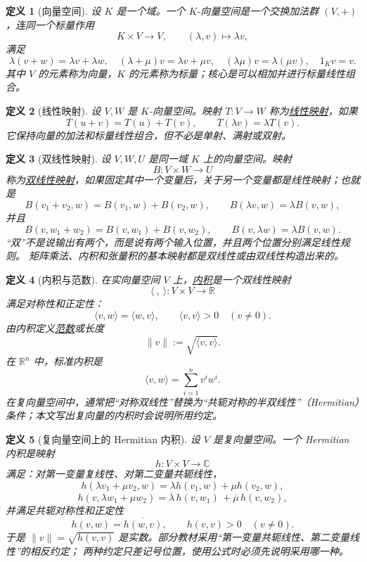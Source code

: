 \documentclass[UTF8,fontset=none,a4paper,11pt]{ctexart}
\theoremstyle{foundation-definition}
\newtheorem{definition}{定义}[section]
\theoremstyle{foundation-theorem}
\theoremstyle{foundation-proposition}
\theoremstyle{foundation-example}
\theoremstyle{foundation-remark}
\theoremstyle{foundation-theorem}
\newcommand{\term}[2]{\hyperref[#1]{#2}}
\begin{document}
\begin{definition}[向量空间]\label{def:vector-space}
设 \(K\) 是一个域。一个 \(K\)-向量空间是一个交换加法群 \((V,+)\)，连同一个标量作用
\[
K\times V\longrightarrow V,\qquad(\lambda,v)\longmapsto\lambda v,
\]
满足
\[
\lambda(v+w)=\lambda v+\lambda w,\quad
(\lambda+\mu)v=\lambda v+\mu v,\quad
(\lambda\mu)v=\lambda(\mu v),\quad
1_Kv=v.
\]
其中 \(V\) 的元素称为向量，\(K\) 的元素称为标量；核心是可以相加并进行标量线性组合。
\end{definition}

\begin{definition}[线性映射]\label{def:linear-map}
设 \(V,W\) 是 \(K\)-向量空间。映射 \(T:V\to W\) 称为\term{def:linear-map}{线性映射}，如果
\[
T(u+v)=T(u)+T(v),\qquad T(\lambda v)=\lambda T(v).
\]
它保持向量的加法和标量线性组合，但不必是单射、满射或双射。
\end{definition}

\begin{definition}[双线性映射]\label{def:bilinear-map}
设 \(V,W,U\) 是同一域 \(K\) 上的向量空间。映射
\[
B:V\times W\longrightarrow U
\]
称为\term{def:bilinear-map}{双线性映射}，如果固定其中一个变量后，关于另一个变量都是线性映射；也就是
\[
B(v_1+v_2,w)=B(v_1,w)+B(v_2,w),\qquad
B(\lambda v,w)=\lambda B(v,w),
\]
并且
\[
B(v,w_1+w_2)=B(v,w_1)+B(v,w_2),\qquad
B(v,\lambda w)=\lambda B(v,w).
\]
“双”不是说输出有两个，而是说有两个输入位置，并且两个位置分别满足线性规则。
矩阵乘法、内积和张量积的基本映射都是双线性或由双线性构造出来的。
\end{definition}

\begin{definition}[内积与范数]\label{def:inner-product}\label{def:norm}
在实向量空间 \(V\) 上，\term{def:inner-product}{内积}是一个双线性映射
\[
\langle\ ,\ \rangle:V\times V\longrightarrow\mathbb R
\]
满足对称性和正定性：
\[
\langle v,w\rangle=\langle w,v\rangle,\qquad
\langle v,v\rangle>0\quad(v\ne0).
\]
由内积定义\term{def:norm}{范数}或长度
\[
\|v\|:=\sqrt{\langle v,v\rangle}.
\]
在 \(\mathbb R^n\) 中，标准内积是
\[
\langle v,w\rangle=\sum_{i=1}^n v^iw^i.
\]
在复向量空间中，通常把“对称双线性”替换为“共轭对称的半双线性”（Hermitian）条件；本文写出复向量的内积时会说明所用约定。
\end{definition}

\begin{definition}[复向量空间上的 Hermitian 内积]\label{def:hermitian-inner-product}
设 \(V\) 是复向量空间。一个 Hermitian 内积是映射
\[
h:V\times V\longrightarrow\mathbb C
\]
满足：对第一变量复线性、对第二变量共轭线性，
\[
h(\lambda v_1+\mu v_2,w)=\lambda h(v_1,w)+\mu h(v_2,w),
\]
\[
h(v,\lambda w_1+\mu w_2)=\overline{\lambda}\,h(v,w_1)
\,+\overline{\mu}\,h(v,w_2),
\]
并满足共轭对称性和正定性
\[
h(v,w)=\overline{h(w,v)},\qquad h(v,v)>0\quad(v\ne0).
\]
于是 \(\|v\|=\sqrt{h(v,v)}\) 是实数。部分教材采用“第一变量共轭线性、第二变量线性”的相反约定；
两种约定只差记号位置，使用公式时必须先说明采用哪一种。
\end{definition}
\end{document}
